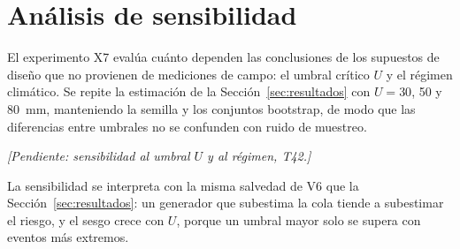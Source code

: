 \section{Análisis de sensibilidad}
\label{sec:sensibilidad}

El experimento X7 evalúa cuánto dependen las conclusiones de los supuestos de diseño que no provienen de mediciones de campo: el umbral crítico $U$ y el régimen climático. Se repite la estimación de la Sección~\ref{sec:resultados} con $U = 30$, 50 y \qty{80}{\milli\metre}, manteniendo la semilla y los conjuntos bootstrap, de modo que las diferencias entre umbrales no se confunden con ruido de muestreo.

\textit{[Pendiente: sensibilidad al umbral $U$ y al régimen, T42.]}

La sensibilidad se interpreta con la misma salvedad de V6 que la Sección~\ref{sec:resultados}: un generador que subestima la cola tiende a subestimar el riesgo, y el sesgo crece con $U$, porque un umbral mayor solo se supera con eventos más extremos.

